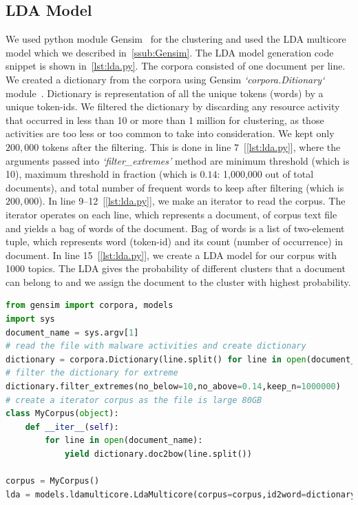 \subsection{LDA Model}
\label{sub:LDA Model}
We used python module Gensim~\cite[Gensim]{gensim}  for the clustering and used the LDA multicore model which we described in~\autoref{ssub:Gensim}.
The LDA model generation code snippet is shown in~\autoref{lst:lda.py}.
The corpora consisted of one document per line.
We created a dictionary from the corpora using Gensim \emph{`corpora.Ditionary`} module~\cite[]{gensimdict}.
Dictionary is representation of all the unique tokens (words) by a unique token-ids.
We filtered the dictionary by discarding any resource activity that occurred in less than 10 or more than 1 million for clustering, as those activities are too less or too common to take into consideration.
We kept only $200,000$ tokens after the filtering.
This is done in line $7$~[\autoref{lst:lda.py}], where the arguments passed into \emph{`filter\_extremes'} method are minimum threshold (which is 10), maximum threshold in fraction (which is $0.14$: 1,000,000 out of total \gettotalmalwareiii{} documents), and total number of frequent words to keep after filtering (which is $200,000$).
In line 9--12~[\autoref{lst:lda.py}], we make an iterator to read the corpus.
The iterator operates on each line, which represents a document, of corpus text file and yields a bag of words of the document.
Bag of words is a list of two-element tuple, which represents word (token-id) and its count (number of occurrence) in document.
In line 15~[\autoref{lst:lda.py}], we create a LDA model for our corpus with 1000 topics.
The LDA gives the probability of different clusters that a document can belong to and we assign the document to the cluster with highest probability.\\
\begin{lstlisting}[float,floatplacement=H,language=python,caption={Script to run Gensim LDA},label={lst:lda.py}]
from gensim import corpora, models
import sys
document_name = sys.argv[1]
# read the file with malware activities and create dictionary
dictionary = corpora.Dictionary(line.split() for line in open(document_name))
# filter the dictionary for extreme
dictionary.filter_extremes(no_below=10,no_above=0.14,keep_n=1000000)
# create a iterator corpus as the file is large 80GB
class MyCorpus(object):
    def __iter__(self):
        for line in open(document_name):
            yield dictionary.doc2bow(line.split())

corpus = MyCorpus()
lda = models.ldamulticore.LdaMulticore(corpus=corpus,id2word=dictionary,num_topics=1000)
\end{lstlisting}

